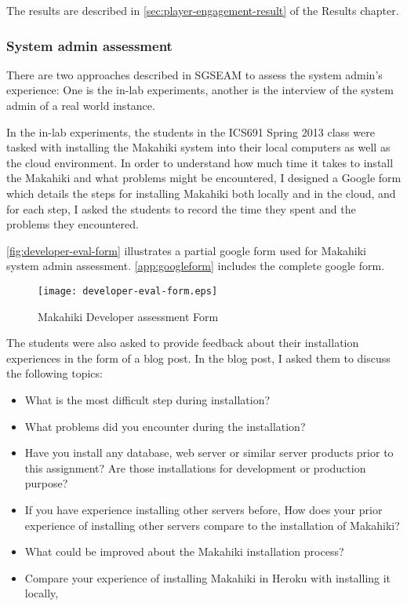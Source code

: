 The results are described in \autoref{sec:player-engagement-result} of the Results chapter.

\subsubsection{System admin assessment}

There are two approaches described in SGSEAM to assess the system admin's experience: One is the in-lab experiments, another is the interview of the system admin of a real world instance.

In the in-lab experiments, the students in the ICS691 Spring 2013 class were tasked with installing the Makahiki system into their local computers as well as the cloud environment. In order to understand how much time it takes to install the Makahiki and what problems might be encountered, I designed a Google form which details the steps for installing Makahiki both locally and in the cloud, and for each step, I asked the students to record the time they spent and the problems they encountered.

\autoref{fig:developer-eval-form} illustrates a partial google form used for Makahiki system admin assessment. \autoref{app:googleform} includes the complete google form.
\begin{figure}[ht!]
   \centering
   \texttt{[image: developer-eval-form.eps]}
   \caption{Makahiki Developer assessment Form}
   \label{fig:developer-eval-form}
\end{figure}

The students were also asked to provide feedback about their installation experiences in the form of a blog post. In the blog post, I asked them to discuss the following topics:
\begin{itemize}
\item What is the most difficult step during installation?
\item What problems did you encounter during the installation?
\item Have you install any database, web server or similar server products prior to this assignment? Are those installations for development or production purpose?
\item If you have experience installing other servers before, How does your prior experience of installing other servers compare to the installation of Makahiki?
\item What could be improved about the Makahiki installation process?
\item Compare your experience of installing Makahiki in Heroku with installing it locally,
\end{itemize}

